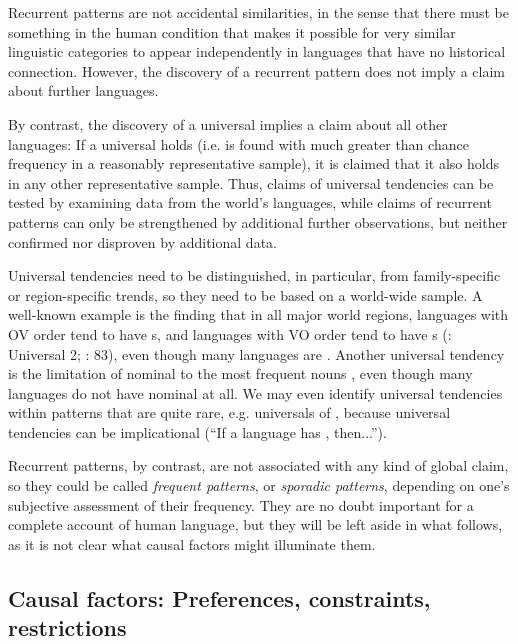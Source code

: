 \documentclass[output=paper]{langsci/langscibook}
\begin{document}
Recurrent patterns are not accidental similarities, in the sense that there must be something in the human condition that makes it possible for very similar linguistic categories to appear independently in languages that have no historical connection. However, the discovery of a recurrent pattern does not imply a claim about further languages.

By contrast, the discovery of a universal implies a claim about all other languages: If a universal holds (i.e. is found with much greater than chance frequency in a reasonably representative sample), it is claimed that it also holds in any other representative sample. Thus, claims of universal tendencies can be tested by examining data from the world’s languages, while claims of recurrent patterns can only be strengthened by additional further observations, but neither confirmed nor disproven by additional data. 

Universal tendencies need to be distinguished, in particular, from family-specific or region-specific trends, so they need to be based on a world-wide sample. A well-known example is the finding that in all major world regions, languages with OV order tend to have s, and languages with VO order tend to have s (\citealt{Greenberg1963}: Universal 2; \citealt{Dryer1992}: 83), even though many languages are . Another universal tendency is the limitation of nominal  to the most frequent nouns \citep{Vafaeian2013}, even though many languages do not have nominal  at all. We may even identify universal tendencies within patterns that are quite rare, e.g. universals of  \citep{Yu2007}, because universal tendencies can be implicational (“If a language has , then...”).

Recurrent patterns, by contrast, are not associated with any kind of global claim, so they could be called \textit{frequent patterns}, or \textit{sporadic patterns}, depending on one’s subjective assessment of their frequency. They are no doubt important for a complete account of human language, but they will be left aside in what follows, as it is not clear what causal factors might illuminate them.

\subsection{Causal factors: Preferences, constraints, restrictions}\label{sec:haspelmath:2.3}
\end{document}
